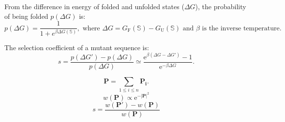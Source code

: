 \documentclass{article}
\newcommand{\e}{\mathrm{e}}
\begin{document}
From the difference in energy of folded and unfolded states ($\Delta G$), the probability of being folded $p(\Delta G)$ is:
\begin{equation*}
p(\Delta G) = \dfrac{1}{1 + e^{\beta \Delta G(\mathbb{S}) }}, \text{ where }
\Delta G = G_{\mathrm{F}}(\mathbb{S}) - G_{\mathrm{U}}(\mathbb{S}) \text{ and $\beta$ is the inverse temperature}.
\end{equation*}

The selection coefficient of a mutant sequence is:
\begin{equation*}
s  = \dfrac{p(\Delta G') - p(\Delta G)}{p(\Delta G)} \simeq \dfrac{ \e^{\beta \left( \Delta G - \Delta G' \right) } - 1}{ \e^{- \beta \Delta G }}.
\end{equation*}

\begin{center}
\end{center}
\begin{equation*}
\bm{P}  = \sum\limits_{1 \leq i \leq n} \bm{P_i}.
\end{equation*}
\begin{equation*}
w(\bm{P}) \propto \e^{ - \left| \bm{P} \right|^2 }
\end{equation*}
\begin{equation*}
s  = \dfrac{w(\bm{P'}) - w(\bm{P})}{w(\bm{P})}
\end{equation*}
\end{document}
